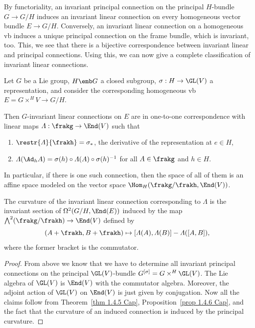 By functoriality, an invariant principal connection on the principal $H$-bundle $G\to G\slash H$ induces an invariant linear connection on every homogeneous vector bundle $E\to G\slash H$. Conversely, an invariant linear connection on a homogeneous \gls{vb} induces a unique principal connection on the frame bundle, which is invariant, too. This, we see that there is a bijective correspondence between invariant linear and principal connections. Using this, we can now give a complete classification of invariant linear connections.

\begin{thm}\label{thm 1.4.7 Cap}
    Let $G$ be a Lie group, $H\emb G$ a closed subgroup, $\sigma:H\to \GL(V)$ a representation, and consider the corresponding homogeneous \gls{vb} $E=G\times^H V\to G\slash H$.

    Then $G$-invariant linear connections on $E$ are in one-to-one correspondence with linear maps $\varLambda:\frakg\to \End(V)$ such that 
    \begin{enumerate}[label=(\roman*)]
        \item $\restr{\varLambda}{\frakh}=\sigma_\ast$, the derivative of the representation at $e\in H$,
        \item $\varLambda(\Ad_h A)=\sigma(h)\circ\varLambda(A)\circ \sigma(h)^{-1}$ for all $A\in\frakg$ and $h\in H$.
    \end{enumerate}
    In particular, if there is one such connection, then the space of all of them is an affine space modeled on the vector space $\Hom_H(\frakg\slash\frakh,\End(V))$.

    The curvature of the invariant linear connection corresponding to $\varLambda$ is the invariant section of $\Omega^2(G\slash H,\End(E))$ induced by the map $\bigwedge\nolimits^2(\frakg\slash\frakh)\to \End(V)$ defined by 
    \[(A+\frakh,B+\frakh)\mapsto [\varLambda(A),\varLambda(B)]-\varLambda([A,B]),\]
    where the former bracket is the commutator.
\end{thm}
\begin{proof}
    From above we know that we have to determine all invariant principal connections on the principal $\GL(V)$-bundle $G^{[\sigma]}=G\times^H \GL(V)$. The Lie algebra of $\GL(V)$ is $\End(V)$ with the commutator algebra. Moreover, the adjoint action of $\GL(V)$ on $\End(V)$ is just given by conjugation. Now all the claims follow from Theorem~\ref{thm 1.4.5 Cap}, Proposition~\ref{prop 1.4.6 Cap}, and the fact that the curvature of an induced connection is induced by the principal curvature.
\end{proof}


